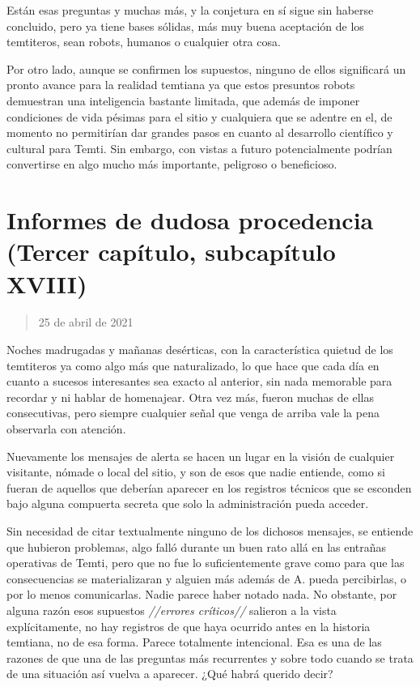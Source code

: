 \documentclass[
  spanish,
]{book}
\begin{document}
Están esas preguntas y muchas más, y la conjetura en sí sigue sin haberse concluido, pero ya tiene bases sólidas, más muy buena aceptación de los temtiteros, sean robots, humanos o cualquier otra cosa.

Por otro lado, aunque se confirmen los supuestos, ninguno de ellos significará un pronto avance para la realidad temtiana ya que estos presuntos robots demuestran una inteligencia bastante limitada, que además de imponer condiciones de vida pésimas para el sitio y cualquiera que se adentre en el, de momento no permitirían dar grandes pasos en cuanto al desarrollo científico y cultural para Temti. Sin embargo, con vistas a futuro potencialmente podrían convertirse en algo mucho más importante, peligroso o beneficioso.

\hypertarget{informes-de-dudosa-procedencia-tercer-capuxedtulo-subcapuxedtulo-xviii}{%
\section{Informes de dudosa procedencia (Tercer capítulo, subcapítulo XVIII)}\label{informes-de-dudosa-procedencia-tercer-capuxedtulo-subcapuxedtulo-xviii}}

\begin{quote}
25 de abril de 2021
\end{quote}

Noches madrugadas y mañanas desérticas, con la característica quietud de los temtiteros ya como algo más que naturalizado, lo que hace que cada día en cuanto a sucesos interesantes sea exacto al anterior, sin nada memorable para recordar y ni hablar de homenajear.
Otra vez más, fueron muchas de ellas consecutivas, pero siempre cualquier señal que venga de arriba vale la pena observarla con atención.

Nuevamente los mensajes de alerta se hacen un lugar en la visión de cualquier visitante, nómade o local del sitio, y son de esos que nadie entiende, como si fueran de aquellos que deberían aparecer en los registros técnicos que se esconden bajo alguna compuerta secreta que solo la administración pueda acceder.

Sin necesidad de citar textualmente ninguno de los dichosos mensajes, se entiende que hubieron problemas, algo falló durante un buen rato allá en las entrañas operativas de Temti, pero que no fue lo suficientemente grave como para que las consecuencias se materializaran y alguien más además de A. pueda percibirlas, o por lo menos comunicarlas. Nadie parece haber notado nada.
No obstante, por alguna razón esos supuestos \emph{//errores críticos//} salieron a la vista explícitamente, no hay registros de que haya ocurrido antes en la historia temtiana, no de esa forma. Parece totalmente intencional.
Esa es una de las razones de que una de las preguntas más recurrentes y sobre todo cuando se trata de una situación así vuelva a aparecer. ¿Qué habrá querido decir?
\end{document}
